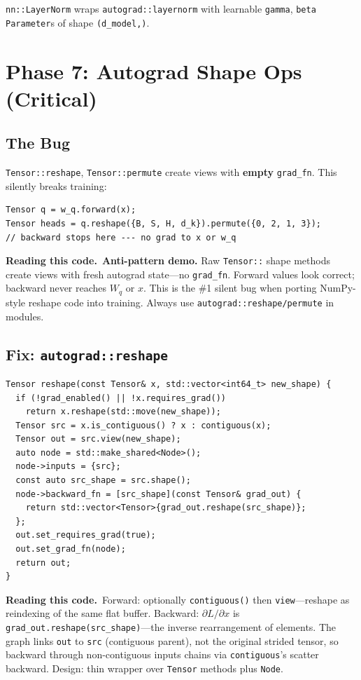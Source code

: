 \documentclass[11pt,a4paper]{article}
\newcommand{\explain}{\par\smallskip\noindent}
\newcommand{\exhead}{\textbf{Reading this code.}\ }
\begin{document}
\texttt{nn::LayerNorm} wraps \texttt{autograd::layernorm} with learnable
\texttt{gamma}, \texttt{beta} \texttt{Parameter}s of shape \texttt{(d\_model,)}.

\section{Phase 7: Autograd Shape Ops (Critical)}
\label{sec:shape-ops}

\subsection{The Bug}

\texttt{Tensor::reshape}, \texttt{Tensor::permute} create views with \textbf{empty}
\texttt{grad\_fn}. This silently breaks training:

\begin{lstlisting}[style=cpp]
Tensor q = w_q.forward(x);
Tensor heads = q.reshape({B, S, H, d_k}).permute({0, 2, 1, 3});
// backward stops here --- no grad to x or w_q
\end{lstlisting}
\explain\exhead \textbf{Anti-pattern demo.} Raw \texttt{Tensor::} shape methods create views with
fresh autograd state---no \texttt{grad\_fn}. Forward values look correct; backward never reaches
$W_q$ or $x$. This is the \#1 silent bug when porting NumPy-style reshape code into training.
Always use \texttt{autograd::reshape/permute} in modules.

\subsection{Fix: \texttt{autograd::reshape}}

\begin{lstlisting}[style=cpp]
Tensor reshape(const Tensor& x, std::vector<int64_t> new_shape) {
  if (!grad_enabled() || !x.requires_grad())
    return x.reshape(std::move(new_shape));
  Tensor src = x.is_contiguous() ? x : contiguous(x);
  Tensor out = src.view(new_shape);
  auto node = std::make_shared<Node>();
  node->inputs = {src};
  const auto src_shape = src.shape();
  node->backward_fn = [src_shape](const Tensor& grad_out) {
    return std::vector<Tensor>{grad_out.reshape(src_shape)};
  };
  out.set_requires_grad(true);
  out.set_grad_fn(node);
  return out;
}
\end{lstlisting}
\explain\exhead Forward: optionally \texttt{contiguous()} then \texttt{view}---reshape as
reindexing of the same flat buffer. Backward: $\partial L/\partial x$ is
\texttt{grad\_out.reshape(src\_shape)}---the inverse rearrangement of elements. The graph links
\texttt{out} to \texttt{src} (contiguous parent), not the original strided tensor, so backward
through non-contiguous inputs chains via \texttt{contiguous}'s scatter backward. Design: thin
wrapper over \texttt{Tensor} methods plus \texttt{Node}.
\end{document}

